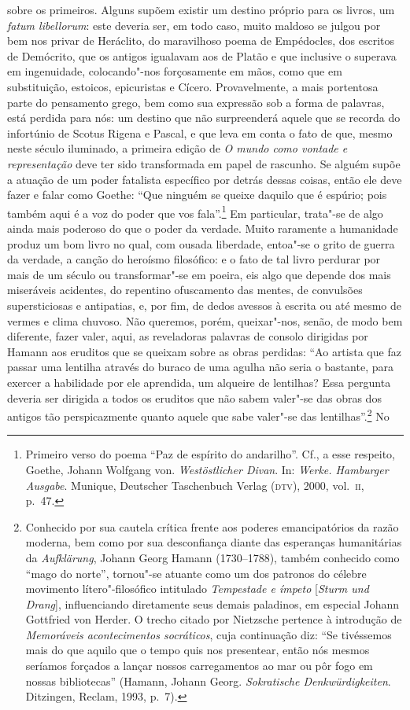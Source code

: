 sobre os primeiros. Alguns supõem existir um destino próprio para os
livros, um \textit{fatum libellorum}: este deveria ser, em todo caso,
muito maldoso se julgou por bem nos privar de Heráclito, do maravilhoso
poema de Empédocles, dos escritos de Demócrito, que os antigos
igualavam aos de Platão e que inclusive o superava em ingenuidade,
colocando"-nos forçosamente em mãos, como que em substituição, estoicos,
epicuristas e Cícero. Provavelmente, a mais portentosa parte do
pensamento grego, bem como sua expressão sob a forma de palavras, está
perdida para nós: um destino que não surpreenderá aquele que se recorda
do infortúnio de Scotus Rigena e Pascal, e que leva em conta o fato de
que, mesmo neste século iluminado, a primeira edição de \textit{O mundo
como vontade e representação} deve ter sido transformada em papel de
rascunho. Se alguém supõe a atuação de um poder fatalista específico
por detrás dessas coisas, então ele deve fazer e falar como Goethe:
``Que ninguém se queixe daquilo que é espúrio; pois também aqui é a voz
do poder que vos fala''.\footnote{ Primeiro verso do poema ``Paz de
espírito do andarilho''. Cf., a esse respeito, Goethe, Johann Wolfgang
von. \textit{Westöstlicher Divan}. In: \textit{Werke. Hamburger
Ausgabe}. Munique, Deutscher Taschenbuch Verlag (\textsc{dtv}), 2000, vol.~\textsc{ii},
p.~47.} Em particular, trata"-se de algo ainda mais poderoso do
que o poder da verdade. Muito raramente a humanidade produz um bom
livro no qual, com ousada liberdade, entoa"-se o grito de guerra da
verdade, a canção do heroísmo filosófico: e o fato de tal livro
perdurar por mais de um século ou transformar"-se em poeira, eis algo
que depende dos mais miseráveis acidentes, do repentino ofuscamento das
mentes, de convulsões supersticiosas e antipatias, e, por fim, de dedos
avessos à escrita ou até mesmo de vermes e clima chuvoso. Não queremos,
porém, queixar"-nos, senão, de modo bem diferente, fazer valer,
aqui, as reveladoras palavras de consolo dirigidas por Hamann aos
eruditos que se queixam sobre as obras perdidas: ``Ao artista que faz
passar uma lentilha através do buraco de uma agulha não seria o
bastante, para exercer a habilidade por ele aprendida, um alqueire de
lentilhas? Essa pergunta deveria ser dirigida a todos os eruditos que
não sabem valer"-se das obras dos antigos tão perspicazmente quanto
aquele que sabe valer"-se das lentilhas''.\footnote{ Conhecido por sua
cautela crítica frente aos poderes emancipatórios da razão moderna, bem
como por sua desconfiança diante das esperanças humanitárias da
\textit{Aufklärung}, Johann Georg Hamann (1730--1788), também conhecido como ``mago do norte'',
tornou"-se atuante como um dos patronos do célebre movimento
lítero"-filosófico intitulado \textit{Tempestade e ímpeto}
[\textit{Sturm und Drang}], influenciando diretamente seus demais
paladinos, em especial Johann Gottfried von Herder. O trecho citado
por Nietzsche pertence à introdução de \textit{Memoráveis
acontecimentos socráticos}, cuja continuação diz: ``Se tivéssemos mais
do que aquilo que o tempo quis nos presentear, então nós mesmos
seríamos forçados a lançar nossos carregamentos ao mar ou pôr fogo em
nossas bibliotecas'' (Hamann, Johann Georg. \textit{Sokratische
Denkwürdigkeiten}. Ditzingen, Reclam, 1993, p.~7).} No
